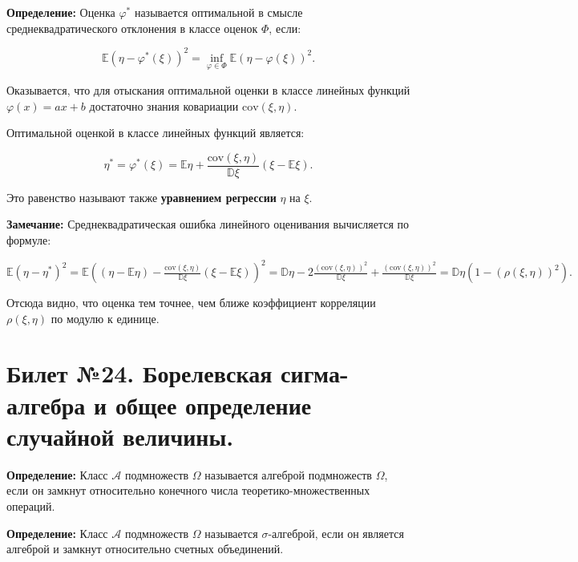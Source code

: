 \textbf{Определение:}  Оценка $\varphi^{*}$ называется оптимальной в смысле среднеквадратического отклонения в классе оценок $\Phi$, если:


\begin{equation*}
	\mathbb{E}(\eta - \varphi^{*}(\xi))^2 = \inf\limits_{\varphi \in \Phi}\mathbb{E}(\eta - \varphi(\xi))^2.
\end{equation*}

Оказывается, что для отыскания оптимальной оценки в классе линейных функций $\varphi(x) = ax + b$ достаточно знания ковариации $\text{cov}(\xi , \eta)$.

Оптимальной оценкой в классе линейных функций является:

\begin{equation*}
	\eta^{*} = \varphi^{*}(\xi) = \mathbb{E}\eta + \frac{\text{cov}(\xi , \eta)}{\mathbb{D}\xi}(\xi - \mathbb{E}\xi).
\end{equation*}

Это равенство называют также \textbf{уравнением регрессии} $\eta$ на $\xi$.
\vspace{5mm}

\textbf{Замечание:} Среднеквадратическая ошибка линейного оценивания
вычисляется по формуле:

\noindent $\mathbb{E}(\eta - \eta^{*})^2 = \mathbb{E}\left((\eta - \mathbb{E}\eta) - \frac{\text{cov}(\xi , \eta)}{\mathbb{D}\xi}(\xi - \mathbb{E}\xi)\right)^2 = \mathbb{D}\eta 	- 2 \frac{(\text{cov}(\xi , \eta))^2}{\mathbb{D}\xi} + \frac{(\text{cov}(\xi , \eta))^2}{\mathbb{D}\xi} = \mathbb{D}\eta (1 - (\rho(\xi , \eta))^2).$
\vspace{5mm}

Отсюда видно, что оценка тем точнее, чем ближе коэффициент корреляции $\rho(\xi , \eta)$  по модулю к единице.

\section{Билет №24. Борелевская сигма-алгебра и общее определение случайной величины.}

\hspace{\parindent}\textbf{Определение:} Класс $\mathscr{A}$ подмножеств $\Omega$ называется алгеброй подмножеств $\Omega$, если он замкнут относительно конечного числа теоретико-множественных операций.
\vspace{5mm}

\textbf{Определение:} Класс $\mathscr{A}$ подмножеств $\Omega$ называется $\sigma$-алгеброй, если
он является алгеброй и замкнут относительно счетных объединений.

